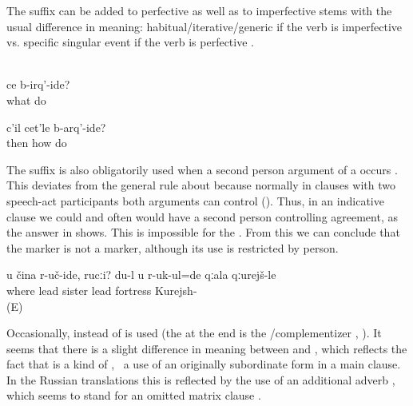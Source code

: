 The suffix can be added to perfective as well as to imperfective stems with the usual difference in meaning: habitual/iterative/generic if the verb is imperfective  vs. specific singular event if the verb is perfective .

\begin{exe}
	\ex	{} \label{ex:What shouldcan we do} \\
	\gll	ce	b-irq'-ide?\\
		what	do\\
	\glt	{}

	\ex	\label{ex:‎Then how should I make (the plough)}
	\gll	c'il	cet'le	b-arq'-ide?\\
		then	how	do\\
	\glt	{}
\end{exe}

The suffix is also obligatorily used when a second person  argument of a  occurs . This deviates from the general rule about  because normally in clauses with two speech-act participants both arguments can control  (). Thus, in an indicative clause we could and often would have a second person controlling agreement, as the answer in  shows. This is impossible for the . From this we can conclude that the  marker is not a  marker, although its use is restricted by person.

\begin{exe}
	\ex	\label{ex:Where should I bring you, sister}
	\gll	u	čina	r-uč-ide,	rucːi?	du-l u r-uk-ul=de qːala qːurejš-le\\
			where	lead	sister	  lead	fortress	Kurejsh-\\
	\glt	{} (E)
\end{exe}

Occasionally,  instead of  is used (the  at the end is the \slash complementizer , ). It seems that there is a slight difference in meaning between  and , which reflects the fact that  is a kind of , \tie\ a use of an originally subordinate form in a main clause. In the Russian translations this is reflected by the use of an additional adverb  , which seems to stand for an omitted matrix clause .

